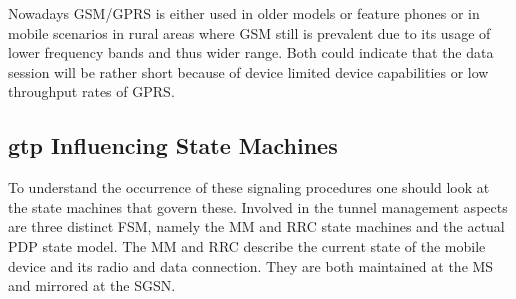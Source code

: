 Nowadays \gls{GSM}/\gls{GPRS} is either used in older models or feature phones or in mobile scenarios in rural areas where \gls{GSM} still is prevalent due to its usage of lower frequency bands and thus wider range. Both could indicate that the data session will be rather short because of device limited device capabilities or low throughput rates of \gls{GPRS}.


\subsection{\texorpdfstring{\acrshort{gtp}}{GTP} Influencing State Machines}

To understand the occurrence of these signaling procedures one should look at the state machines that govern these. Involved in the tunnel management aspects are three distinct \gls{FSM}, namely the \gls{MM} and \gls{RRC} state machines and the actual \gls{PDP} state model. The \gls{MM} and \gls{RRC} describe the current state of the mobile device and its radio and data connection. They are both maintained at the \gls{MS} and mirrored at the \gls{SGSN}.

